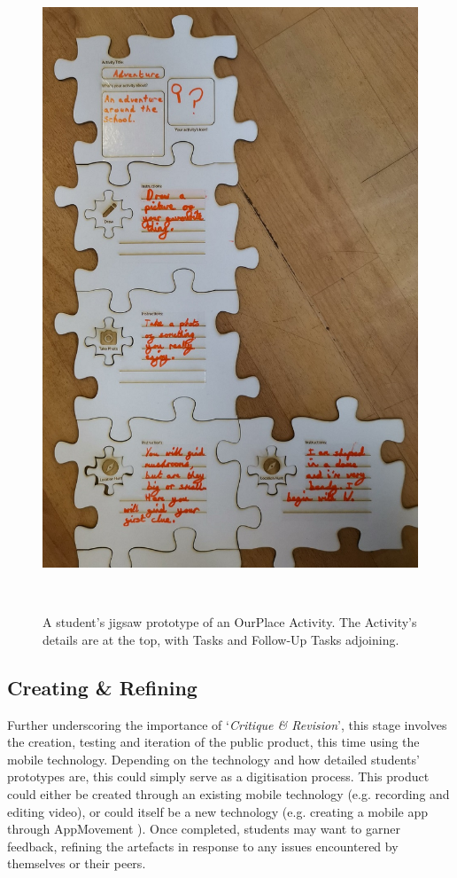 \begin{figure}
\centering
  \includegraphics[width=0.75\columnwidth]{images/chapter08/jigsawprototype.jpg}
  \caption[A student's jigsaw prototype]{A student's jigsaw prototype of an OurPlace Activity. The Activity's details are at the top, with Tasks and Follow-Up Tasks adjoining.}~\label{fig:Prototype}
\end{figure}

\subsection{Creating \& Refining}
Further underscoring the importance of `\textit{Critique \& Revision}', this stage involves the creation, testing and iteration of the public product, this time using the mobile technology. Depending on the technology and how detailed students' prototypes are, this could simply serve as a digitisation process. This product could either be created through an existing mobile technology (e.g. recording and editing video), or could itself be a new technology (e.g. creating a mobile app through AppMovement \citep{Garbett2016}). Once completed, students may want to garner feedback, refining the artefacts in response to any issues encountered by themselves or their peers. 

